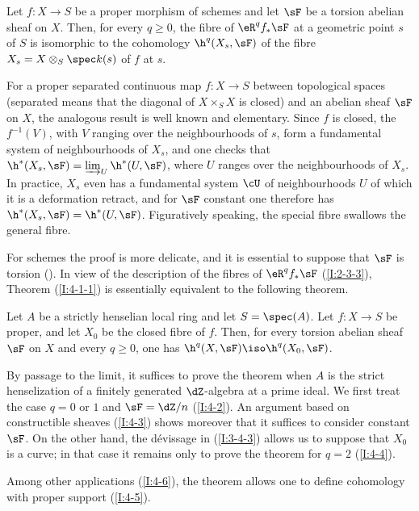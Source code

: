 \begin{theorem}\label{I:4-1-1}
Let $f:X\to S$ be a proper morphism of schemes and let $\sF$ be a
torsion abelian sheaf on $X$. Then, for every $q\geqslant0$, the fibre
of $\eR^qf_*\sF$ at a geometric point $s$ of $S$ is isomorphic to the
cohomology $\h^q(X_s,\sF)$ of the fibre
$X_s=X\otimes_S\spec k(s)$ of $f$ at $s$.
\end{theorem}

For a proper separated continuous map $f:X\to S$ between topological
spaces (separated means that the diagonal of $X\times_SX$ is closed) and
an abelian sheaf $\sF$ on $X$, the analogous result is well known and
elementary. Since $f$ is closed, the $f^{-1}(V)$, with $V$ ranging over
the neighbourhoods of $s$, form a fundamental system of neighbourhoods
of $X_s$, and one checks that
$\h^*(X_s,\sF)=\varinjlim_U\h^*(U,\sF)$, where $U$ ranges
over the neighbourhoods of $X_s$. In practice, $X_s$ even has a
fundamental system $\cU$ of neighbourhoods $U$ of which it is a
deformation retract, and for $\sF$ constant one therefore has
$\h^*(X_s,\sF)=\h^*(U,\sF)$. Figuratively speaking, the
special fibre swallows the general fibre.

For schemes the proof is more delicate, and it is essential to suppose
that $\sF$ is torsion (). In view of the description of
the fibres of $\eR^qf_*\sF$ (\ref{I:2-3-3}), Theorem
(\ref{I:4-1-1}) is essentially equivalent to the following theorem.

\begin{theorem}\label{I:4-1-2}
Let $A$ be a strictly henselian local ring and let $S=\spec(A)$. Let
$f:X\to S$ be proper, and let $X_0$ be the closed fibre of $f$. Then, for every
torsion abelian sheaf $\sF$ on $X$ and every $q\geqslant0$, one has
$\h^q(X,\sF)\iso\h^q(X_0,\sF)$.
\end{theorem}

By passage to the limit, it suffices to prove the theorem when $A$ is the
strict henselization of a finitely generated $\dZ$-algebra at a prime
ideal. We first treat the case $q=0$ or $1$ and $\sF=\dZ/n$
(\ref{I:4-2}). An argument based on constructible sheaves (\ref{I:4-3})
shows moreover that it suffices to consider constant $\sF$. On the other
hand, the dévissage in (\ref{I:3-4-3}) allows us to suppose that $X_0$
is a curve; in that case it remains only to prove the theorem for $q=2$
(\ref{I:4-4}).

Among other applications (\ref{I:4-6}), the theorem allows one to define
cohomology with proper support (\ref{I:4-5}).

